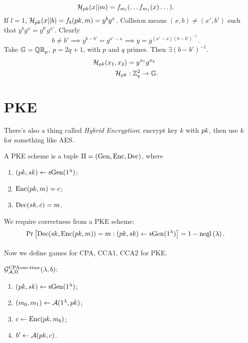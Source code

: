 \begin{equation*}
	\mathcal{H}_{pk}(x || m) = f_{m_l}( \dots f_{m_1} (x) \dots).
\end{equation*}
If $l = 1$, $\mathcal{H}_{pk}(x || b) = f_b(pk, m) = y^{b} g^x$.
Collision means $(x, b) \neq (x', b')$ such that $y^b g^x = y^{b'} g^{x'}$.
Clearly
\begin{equation*}
	b \neq b' \implies y^{b-b'} = g^{x'-x} \implies y = g^{(x'-x)(b-b')^{-1}}.
\end{equation*}
Take $\mathbb{G} = \mathbb{QR}_p$, $p = 2q + 1$, with $p$ and $q$ primes.
Then $\exists (b - b')^{-1}$.
\begin{align*}
	\mathcal{H}_{pk}(x_1, x_2) & = y^{x_1} g^{x_2} \\
	\mathcal{H}_{pk} & : \mathbb{Z}_q^2 \to \mathbb{G}.
\end{align*}

\section{\acl{PKE}}


There's also a thing called \emph{Hybrid Encryption}: encrypt key $k$ with $pk$, then use $k$ for something like \ac{AES}.

\begin{definition}
	A \ac{PKE} scheme is a tuple $\Pi = \left( \mathrm{Gen} , \allowbreak \mathrm{Enc} , \allowbreak \mathrm{Dec} \right)$, where
	\begin{enumerate}
		\item $(pk, sk) \leftarrow {\scriptstyle \$} {\mathrm{Gen}(1^{\lambda})}$;
		\item $\mathrm{Enc}(pk, m) = c$;
		\item $\mathrm{Dec}(sk, c) = m$.
	\end{enumerate}
\end{definition}
We require correctness from a \ac{PKE} scheme:
\begin{equation*}
	\mathop{\mathrm{Pr}}\limits_{} \left[ {
		\mathrm{Dec}(sk, \mathrm{Enc}(pk, m)) = m : (pk, sk) \leftarrow {\scriptstyle \$} {\mathrm{Gen}(1^{\lambda})}
	} \right]
	= 1 - \mathrm{negl}\left({\lambda}\right).
\end{equation*}

Now we define games for \ac{CPA}, \ac{CCA}1, \ac{CCA}2 for \ac{PKE}.

\begin{definition}
	$\mathcal{G}_{\mathcal{A}, \Pi}^{\text{CPA \\ one-time}}(\lambda, b)$:
	\begin{enumerate}
		\item $(pk, sk) \leftarrow {\scriptstyle \$} {\mathrm{Gen}(1^{\lambda})}$;
		\item $(m_0, m_1) \leftarrow \mathcal{A}(1^{\lambda}, pk)$;
		\item $c \leftarrow \mathrm{Enc}(pk, m_b)$;
		\item $b' \leftarrow \mathcal{A}(pk, c)$. \qedhere
	\end{enumerate}
\end{definition}

